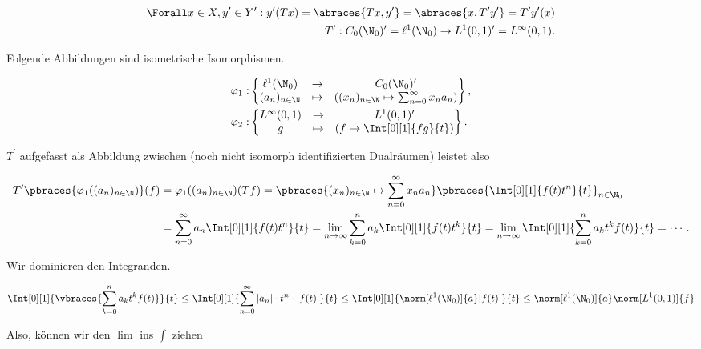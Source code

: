 \begin{solution}
\begin{align*}
  \Forall x \in X, y^\prime \in Y^\prime:
  y^\prime(T x)
  =
  \abraces{T x, y^\prime}
  =
  \abraces{x, T^\prime y^\prime}
  =
  T^\prime y^\prime(x) \\
  \quad
  T^\prime:
  C_0(\N_0)^\prime = \ell^1(\N_0)
  \to
  L^1(0, 1)^\prime = L^\infty(0, 1).
\end{align*}

Folgende Abbildungen sind isometrische Isomorphismen.

\begin{align*}
  \varphi_1:
  &
  \begin{Bmatrix}
    \ell^1(\N_0)        & \to     & C_0(\N_0)^\prime \\
    (a_n)_{n \in \N} & \mapsto &
    ((x_n)_{n \in \N} \mapsto \sum_{n=0}^\infty x_n a_n)
  \end{Bmatrix}, \\
  \varphi_2:
  &
  \begin{Bmatrix}
    L^\infty(0, 1) & \to    & L^1(0, 1)^\prime \\
    g              &\mapsto & (f \mapsto \Int[0][1]{fg}{t})
  \end{Bmatrix}.
\end{align*}

$T^\prime$ aufgefasst als Abbildung zwischen (noch nicht isomorph identifizierten Dualräumen) leistet also

\begin{align*}
  T^\prime \pbraces
  {
    \varphi_1((a_n)_{n \in \N})
  }(f)
  & =
  \varphi_1((a_n)_{n \in \N})(T f)
  =
  \pbraces{(x_n)_{n \in \N} \mapsto \sum_{n=0}^\infty x_n a_n}
  \pbraces{\Int[0][1]{f(t) t^n}{t}}_{n \in \N_0} \\
  & =
  \sum_{n=0}^\infty a_n
  \Int[0][1]{f(t) t^n}{t}
  =
  \lim_{n \to \infty} \sum_{k= 0}^n a_k
  \Int[0][1]{f(t) t^k}{t}
  =
  \lim_{n \to \infty}
  \Int[0][1]{\sum_{k=0}^n a_k t^k f(t)}{t} = \cdots.
\end{align*}

Wir dominieren den Integranden.

\begin{align*}
  \Int[0][1]
  {
    \vbraces
    {
      \sum_{k=0}^n a_k t^k f(t)
    }
  }
  {t}
  \leq
  \Int[0][1]{\sum_{n=0}^\infty |a_n| \cdot t^n \cdot |f(t)|}{t}
  \leq
  \Int[0][1]{\norm[\ell^1(\N_0)]{a} |f(t)|}{t}
  \leq
  \norm[\ell^1(\N_0)]{a} \norm[L^1(0, 1)]{f}
\end{align*}

Also, können wir den $\lim$ ins $\int$ ziehen


\end{solution}
